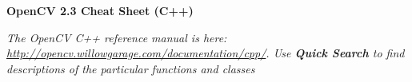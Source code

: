 \documentclass[10pt,landscape]{article}
\makeatletter
\renewcommand{\section}{\@startsection{section}{1}{0mm}%
                                {-1ex plus -.5ex minus -.2ex}%
                                {0.5ex plus .2ex}%
                                {\normalfont\large\bfseries}}
\makeatother
\begin{document}
\raggedright
\footnotesize
\begin{multicols}{3}


\setlength{\premulticols}{1pt}
\setlength{\postmulticols}{1pt}
\setlength{\multicolsep}{1pt}
\setlength{\columnsep}{2pt}

\begin{center}
     \Large{\textbf{OpenCV 2.3 Cheat Sheet (C++)}} \\
\end{center}
\newlength{\MyLen}


\emph{The OpenCV C++ reference manual is here: \url{http://opencv.willowgarage.com/documentation/cpp/}. Use \textbf{Quick Search} to find descriptions of the particular functions and classes}


\end{multicols}
\end{document}
